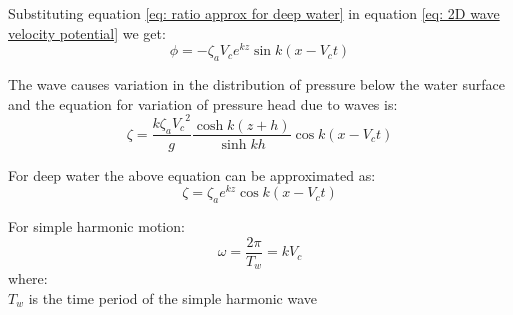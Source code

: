 Substituting equation \ref{eq: ratio approx for deep water} in equation 
\ref{eq: 2D wave velocity potential} we get:
\begin{equation}
  \phi = - \zeta_a V_c e^{k z} \sin k(x - V_c t)
  \label{eq: 2D wave velocity potential for deep water}
\end{equation}

The wave causes variation in the distribution of pressure below the water
surface and the equation for variation of pressure head due to waves is:
\begin{equation}
  \zeta = \frac{k \zeta_a {V_c}^2}{g} \frac{\cosh k(z + h)}{\sinh k h} \cos k(x
  - V_c t)
  \label{eq: pressure head variation}
\end{equation}

For deep water the above equation can be approximated as:
\begin{equation}
  \zeta = \zeta_a e^{k z} \cos k(x - V_c t)
  \label{eq: pressure head variation for deep water}
\end{equation}

For simple harmonic motion: 
\begin{equation}
  \omega = \frac{2 \pi}{T_w} = k V_c
  \label{eq: simple harmonic motion}
\end{equation}
where: \\
$T_w$ is the time period of the simple harmonic wave\\

